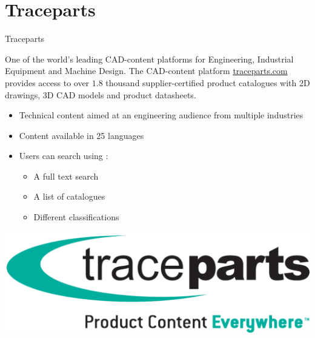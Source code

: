 \section{Traceparts}
\begin{frame}{Traceparts}

    \begin{center}
        One of the world's leading CAD-content platforms for Engineering, Industrial Equipment and Machine Design. The CAD-content platform \href{http://traceparts.com/}{traceparts.com} provides access to over $1.8$ thousand supplier-certified product catalogues with 2D drawings, 3D CAD models and product datasheets.
    \end{center}

    \begin{itemize}
        \item Technical content aimed at an engineering audience from multiple industries
        \item Content available in 25 languages
        \item Users can search using :
        \begin{itemize}
            \item A full text search
            \item A list of catalogues
            \item Different classifications
        \end{itemize}
    \end{itemize}
    
    \begin{center}
        \includegraphics[scale=0.1]{images/traceparts_logo.png}
    \end{center}
    
\end{frame}


    
